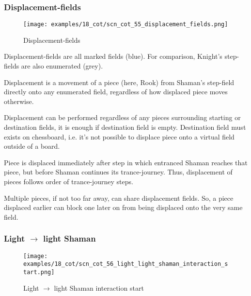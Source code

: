 \subsubsection*{Displacement-fields}
\label{sec:Conquest of Tlalocan/Trance-journey/Interactions/Displacement-fields}

\vspace*{-1.5\baselineskip}
\noindent
\begin{figure}[!h]
\texttt{[image: examples/18\_cot/scn\_cot\_55\_displacement\_fields.png]}
\caption{Displacement-fields}
\label{fig:scn_cot_55_displacement_fields}
\end{figure}

Displacement-fields are all marked fields (blue). For comparison, Knight's
step-fields are also enumerated (grey).

Displacement is a movement of a piece (here, Rook) from Shaman's step-field directly
onto any enumerated field, regardless of how displaced piece moves otherwise.

Displacement can be performed regardless of any pieces surrounding starting or
destination fields, it is enough if destination field is empty. Destination field
must exists on chessboard, i.e. it's not possible to displace piece onto a virtual
field outside of a board.

Piece is displaced immediately after step in which entranced Shaman reaches that
piece, but before Shaman continues its trance-journey. Thus, displacement of pieces
follows order of trance-journey steps.

Multiple pieces, if not too far away, can share displacement fields. So, a piece
displaced earlier can block one later on from being displaced onto the very same
field.

\clearpage %

\subsubsection*{Light $\rightarrow$ light Shaman}
\label{sec:Conquest of Tlalocan/Trance-journey/Interactions/Light --> light Shaman}

\vspace*{-1.2\baselineskip}
\noindent
\begin{figure}[!h]
\texttt{[image: examples/18\_cot/scn\_cot\_56\_light\_light\_shaman\_interaction\_start.png]}
\caption{Light $\rightarrow$ light Shaman interaction start}
\label{fig:scn_cot_56_light_light_shaman_interaction_start}
\end{figure}

